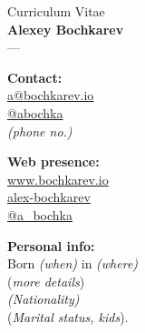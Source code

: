 \documentclass[11pt, a4paper]{article} \usepackage{geometry} %
\begin{document}
\noindent
  \begin{minipage}{0.75\linewidth}
    \strut\vspace*{-\baselineskip}\newline
    \begin{center}
    {\LARGE Curriculum Vitae\\\vspace{0.5em}\textbf{Alexey Bochkarev}}\\
    ---
    \end{center}

    \begin{minipage}{0.30\textwidth}
      \textbf{Contact:}\\
      \faEnvelope \href{mailto:a@bochkarev.io}{a@bochkarev.io}\\
      \faTelegram \href{https://t.me/abochka}{@abochka}\\
      \faPhone \textit{(phone no.)}\\
    \end{minipage}\hfill%
    \begin{minipage}{0.30\textwidth}
      \textbf{Web presence:}\\
      \faGlobe \href{https://www.bochkarev.io}{www.bochkarev.io}\\
      \faGithub \href{https://github.com/alex-bochkarev}{alex-bochkarev}\\
      \faTwitter \href{https://twitter.com/a_bochka}{@a\_bochka}\\
    \end{minipage}\hfill%
    \begin{minipage}{0.33\textwidth}
      \textbf{Personal info:} \\
      Born \textit{(when)} in \textit{(where)}\\
      (\textit{more details})\\\textit{(Nationality)}\\
      (\textit{Marital status, kids}).
    \end{minipage}
  \end{minipage}\hfill%
\end{document}

